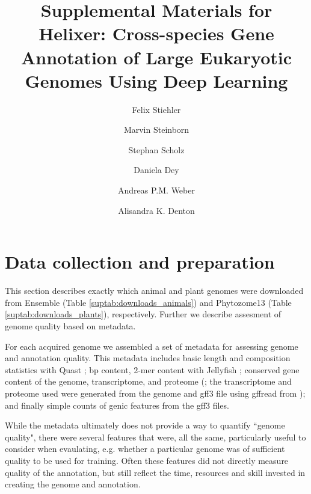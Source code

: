 \documentclass{article}
\begin{document}
\title{Supplemental Materials for \\ Helixer: Cross-species Gene Annotation of Large Eukaryotic Genomes Using Deep Learning}

\author[1]{Felix Stiehler}
\author[1]{Marvin Steinborn}
\author[ \hspace{-1ex}]{Stephan Scholz}
\author[ \hspace{-1ex}]{Daniela Dey}
\author[1]{Andreas P.M. Weber}
\author[1]{Alisandra K. Denton}


\date{}
\maketitle
\tableofcontents

\newpage
\section{Data collection and preparation}
\label{ssec:data_prep}
This section describes exactly which animal and plant genomes were downloaded
from Ensemble (Table \ref{suptab:downloads_animals}) and 
Phytozome13 (Table \ref{suptab:downloads_plants}), respectively.
Further we describe assesment of genome quality based on metadata. 

For each acquired genome we assembled a set of metadata for assessing 
genome and annotation quality. 
This metadata includes basic length and 
composition statistics with Quast \citep{gurevich2013quast}; 
bp content, 2-mer content with Jellyfish \citep{marccais2011fast};
conserved gene content of the genome, transcriptome, and proteome (\cite{simao2015busco};
the transcriptome and proteome used were generated from the genome and gff3 file 
using gffread from \cite{trapnell2012differential}); 
and finally simple counts of genic features from the gff3 files.

While the metadata ultimately does not provide a way to quantify ``genome quality",
there were several features that were, all the same, particularly useful to consider
when evaulating, e.g. whether a particular genome was of sufficient quality to be
used for training. Often these features did not directly measure quality of
the annotation, but still reflect the time, resources and skill invested in
creating the genome and annotation. 
\end{document}
